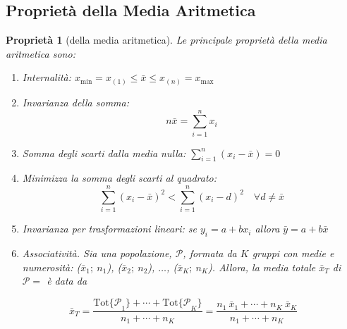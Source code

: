 \documentclass[
  11pt,
]{book}
\theoremstyle{mytheoremstyle}
\newtheorem{proposition}{Proprietà}[section]
\theoremstyle{mydefstyle}
\begin{document}
\subsection{Proprietà della Media Aritmetica}\label{proprietuxe0-della-media-aritmetica}

\begin{info}

\begin{proposition}[della media aritmetica]
Le principale proprietà della media aritmetica sono:

\begin{enumerate}
\def\labelenumi{\arabic{enumi}.}
\setcounter{enumi}{-1}
\item
  Internalità: \(x_{\min} = x_{(1)} \le \bar{x} \le x_{(n)} = x_{\max}\)
\item
  Invarianza della somma: \[n\bar x=\sum_{i=1}^n x_i\]
\item
  Somma degli scarti dalla media nulla: \(\sum_{i=1}^{n} (x_{i} - \bar{x}) = 0\)
\item
  Minimizza la somma degli scarti al quadrato:
  \[
  \sum_{i=1}^{n} (x_{i} - \bar{x})^{2} < \sum_{i=1}^{n} (x_{i} -
  d)^{2} \quad \forall d \ne \bar{x}
  \]
\item
  Invarianza per trasformazioni lineari: se \(y_i=a+bx_i\) allora \(\bar{y} = a + b \bar{x}\)
\item
  Associatività. Sia una popolazione, \(\mathscr{P}\), formata da \(K\)
  gruppi con medie e numerosità: (\(\bar{x}_{1};\ n_{1}\)),
  (\(\bar{x}_{2};\ n_{2}\)), \(\ldots\), (\(\bar{x}_{K};\ n_{K}\)). Allora,
  la media totale \(\bar{x}_{T}\) di \(\mathscr{P}=\) è data da
\end{enumerate}

\[
  \bar{x}_{T}
= \frac{\mbox{Tot}{ \{\mathscr{P}}_1\} +  \cdots +
        \mbox{Tot}{ \{\mathscr{P}}_K\}} {n_{1} + \cdots + n_{K}}
= \frac{n_{1}\ \bar{x}_{1} + \cdots + n_{K}\ \bar{x}_{K}}
       {n_{1} + \cdots + n_{K}}
\]
\end{proposition}

\end{info}
\end{document}
